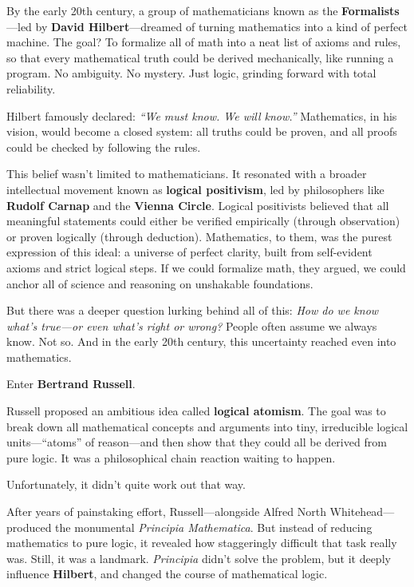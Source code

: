 By the early 20th century, a group of mathematicians known as the \textbf{Formalists}---led by \textbf{David Hilbert}---dreamed of turning mathematics into a kind of perfect machine. The goal? To formalize all of math into a neat list of axioms and rules, so that every mathematical truth could be derived mechanically, like running a program. No ambiguity. No mystery. Just logic, grinding forward with total reliability.

Hilbert famously declared: \textit{``We must know. We will know.''} Mathematics, in his vision, would become a closed system: all truths could be proven, and all proofs could be checked by following the rules.

This belief wasn’t limited to mathematicians. It resonated with a broader intellectual movement known as \textbf{logical positivism}, led by philosophers like \textbf{Rudolf Carnap} and the \textbf{Vienna Circle}. Logical positivists believed that all meaningful statements could either be verified empirically (through observation) or proven logically (through deduction). Mathematics, to them, was the purest expression of this ideal: a universe of perfect clarity, built from self-evident axioms and strict logical steps. If we could formalize math, they argued, we could anchor all of science and reasoning on unshakable foundations.

But there was a deeper question lurking behind all of this: \textit{How do we know what’s true—or even what’s right or wrong?} People often assume we always know. Not so. And in the early 20th century, this uncertainty reached even into mathematics.

Enter \textbf{Bertrand Russell}.

Russell proposed an ambitious idea called \textbf{logical atomism}. The goal was to break down all mathematical concepts and arguments into tiny, irreducible logical units---``atoms'' of reason---and then show that they could all be derived from pure logic. It was a philosophical chain reaction waiting to happen.

Unfortunately, it didn’t quite work out that way.

After years of painstaking effort, Russell---alongside Alfred North Whitehead---produced the monumental \textit{Principia Mathematica}. But instead of reducing mathematics to pure logic, it revealed how staggeringly difficult that task really was. Still, it was a landmark. \textit{Principia} didn’t solve the problem, but it deeply influence \textbf{Hilbert}, and changed the course of mathematical logic.


